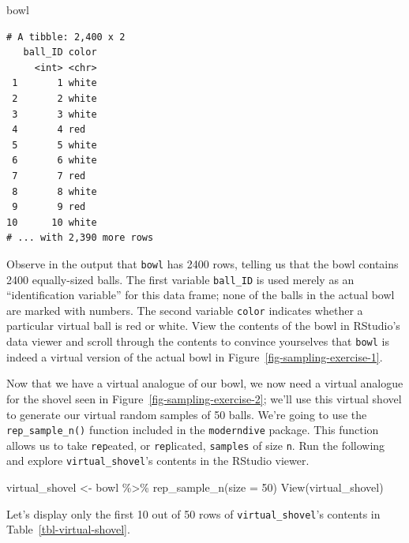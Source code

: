 \documentclass[
  letterpaper,
  DIV=11,
  numbers=noendperiod]{scrreprt}
\newenvironment{Shaded}{\begin{snugshade}}{\end{snugshade}}
\newcommand{\AttributeTok}[1]{\textcolor[rgb]{0.40,0.45,0.13}{#1}}
\newcommand{\DecValTok}[1]{\textcolor[rgb]{0.68,0.00,0.00}{#1}}
\newcommand{\FunctionTok}[1]{\textcolor[rgb]{0.28,0.35,0.67}{#1}}
\newcommand{\NormalTok}[1]{\textcolor[rgb]{0.00,0.23,0.31}{#1}}
\newcommand{\OtherTok}[1]{\textcolor[rgb]{0.00,0.23,0.31}{#1}}
\newcommand{\SpecialCharTok}[1]{\textcolor[rgb]{0.37,0.37,0.37}{#1}}
\theoremstyle{definition}
\theoremstyle{remark}
\begin{document}
\begin{Shaded}
\begin{Highlighting}[]
\NormalTok{bowl}
\end{Highlighting}
\end{Shaded}

\begin{verbatim}
# A tibble: 2,400 x 2
   ball_ID color
     <int> <chr>
 1       1 white
 2       2 white
 3       3 white
 4       4 red  
 5       5 white
 6       6 white
 7       7 red  
 8       8 white
 9       9 red  
10      10 white
# ... with 2,390 more rows
\end{verbatim}

Observe in the output that \texttt{bowl} has 2400 rows, telling us that
the bowl contains 2400 equally-sized balls. The first variable
\texttt{ball\_ID} is used merely as an ``identification variable'' for
this data frame; none of the balls in the actual bowl are marked with
numbers. The second variable \texttt{color} indicates whether a
particular virtual ball is red or white. View the contents of the bowl
in RStudio's data viewer and scroll through the contents to convince
yourselves that \texttt{bowl} is indeed a virtual version of the actual
bowl in Figure~\ref{fig-sampling-exercise-1}.

Now that we have a virtual analogue of our bowl, we now need a virtual
analogue for the shovel seen in Figure~\ref{fig-sampling-exercise-2};
we'll use this virtual shovel to generate our virtual random samples of
50 balls. We're going to use the \texttt{rep\_sample\_n()} function
included in the \texttt{moderndive} package. This function allows us to
take \texttt{rep}eated, or \texttt{rep}licated, \texttt{samples} of size
\texttt{n}. Run the following and explore \texttt{virtual\_shovel}'s
contents in the RStudio viewer.

\begin{Shaded}
\begin{Highlighting}[]
\NormalTok{virtual\_shovel }\OtherTok{\textless{}{-}}\NormalTok{ bowl }\SpecialCharTok{\%\textgreater{}\%} 
  \FunctionTok{rep\_sample\_n}\NormalTok{(}\AttributeTok{size =} \DecValTok{50}\NormalTok{)}
\FunctionTok{View}\NormalTok{(virtual\_shovel)}
\end{Highlighting}
\end{Shaded}

Let's display only the first 10 out of 50 rows of
\texttt{virtual\_shovel}'s contents in Table~\ref{tbl-virtual-shovel}.
\end{document}
